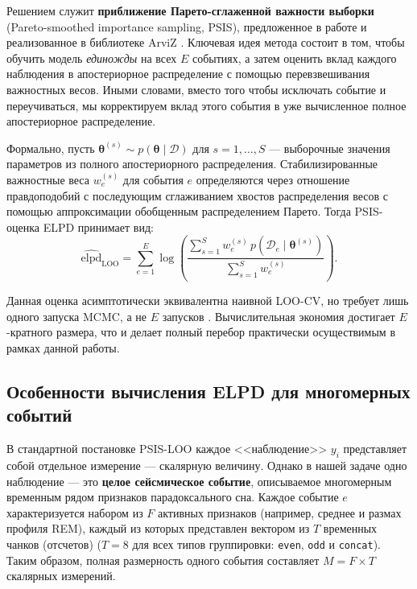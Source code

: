 \documentclass[14pt]{mmcs_article}
\begin{document}
Решением служит \textbf{приближение Парето-сглаженной важности
	выборки} (Pareto-smoothed importance sampling, PSIS),
предложенное в работе \cite{Vehtari2017} и реализованное в
библиотеке ArviZ \cite{Kumar2019}. Ключевая идея метода состоит
в том, чтобы обучить модель \textit{единожды} на всех $E$
событиях, а затем оценить вклад каждого наблюдения в
апостериорное распределение с помощью перевзвешивания
важностных весов. Иными словами, вместо того чтобы исключать
событие и переучиваться, мы корректируем вклад этого события в
уже вычисленное полное апостериорное распределение.

Формально, пусть $\boldsymbol{\theta}^{(s)} \sim
p(\boldsymbol{\theta} \mid \mathcal{D})$ для $s = 1, \dots, S$ —
выборочные значения параметров из полного апостериорного
распределения. Стабилизированные важностные веса $w_e^{(s)}$
для события $e$ определяются через отношение правдоподобий с
последующим сглаживанием хвостов распределения весов с помощью
аппроксимации обобщенным распределением Парето. Тогда
PSIS-оценка ELPD принимает вид:
\begin{equation}\label{eq:psis_elpd}
	\widehat{\mathrm{elpd}}_{\mathrm{LOO}} = 
	\sum_{e=1}^{E} \log \left( 
	\frac{ \sum_{s=1}^{S} w_e^{(s)} \, 
		p(\mathcal{D}_e \mid \boldsymbol{\theta}^{(s)}) }
	{ \sum_{s=1}^{S} w_e^{(s)} }
	\right).
\end{equation}

Данная оценка асимптотически эквивалентна наивной LOO-CV, но
требует лишь одного запуска MCMC, а не $E$ запусков
\cite{Vehtari2017}. Вычислительная экономия достигает
$E$-кратного размера, что и делает полный перебор практически
осуществимым в рамках данной работы.

\subsection*{Особенности вычисления ELPD для многомерных событий}

В стандартной постановке PSIS-LOO каждое <<наблюдение>> $y_i$
представляет собой отдельное измерение — скалярную величину.
Однако в нашей задаче одно наблюдение — это \textbf{целое
	сейсмическое событие}, описываемое многомерным временным рядом
признаков парадоксального сна. Каждое событие $e$
характеризуется набором из $F$ активных признаков (например,
среднее и размах профиля REM), каждый из которых представлен
вектором из $T$ временных чанков (отсчетов) ($T = 8$ для всех типов
группировки: \texttt{even}, \texttt{odd} и \texttt{concat}).
Таким образом, полная размерность одного события составляет
$M = F \times T$ скалярных измерений.
\end{document}
